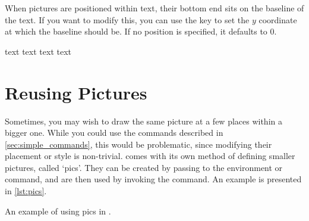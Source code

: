 When \TikZ{} pictures are positioned within text, their bottom end sits on the
baseline of the text. If you want to modify this, you can use the  key
to set the \(y\) coordinate at which the baseline should be. If no position is
specified, it defaults to \(0\).
\begin{example}[vertical_mode, examplewidth=0.8\linewidth]
text 
text 
text  text
\end{example}

\section{Reusing Pictures}

Sometimes, you may wish to draw the same picture at a few places within a bigger
one. While you could use the commands described in
\autoref{sec:simple_commands}, this would be problematic, since modifying their
placement or style is non-trivial. \TikZ{} comes with its own method of
defining smaller pictures, called `pics'. They can be created by passing
 to the \TikZ{} environment or command,
and are then used by invoking the  command. An example is
presented in \autoref{lst:pics}.
\begin{listing}
  \begin{example}[vertical_mode, examplewidth=0.9\linewidth]
\end{example}
  \caption{An example of using pics in \TikZ{}.}\label{lst:pics}
\end{listing}

